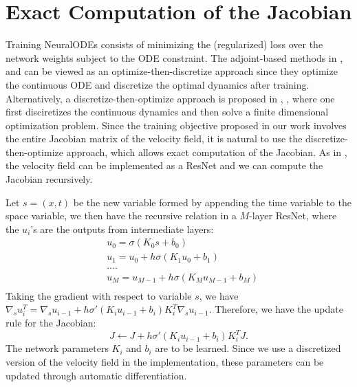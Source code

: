 \newpage

\appendix








\section{Exact Computation of the Jacobian}\label{ExactCompJacobian}
Training NeuralODEs consists of minimizing the (regularized) loss over the network weights subject to the ODE constraint. The adjoint-based methods in \cite{NeuralODE}, \cite{ffjord} and \cite{HowToTrain} can be viewed as an optimize-then-discretize approach since they optimize the continuous ODE and discretize the optimal dynamics after training. Alternatively, a discretize-then-optimize approach is proposed in \cite{OTFlow}, \cite{DiscretizeOptimize}, where one first disciretizes the continuous dynamics and then solve a finite dimensional optimization problem. Since the training objective proposed in our work involves the entire Jacobian matrix of the velocity field, it is natural to use the discretize-then-optimize approach, which allows exact computation of the Jacobian. As in \cite{OTFlow}, the velocity field can be implemented as a ResNet and we can compute the Jacobian recursively. 

Let $s = (x,t)$ be the new variable formed by appending the time variable to the space variable, we then have the recursive relation in a $M$-layer ResNet, where the $u_i$'s are the outputs from intermediate layers:
\begin{align*}
&u_0 = \sigma(K_0s + b_0)\\
&u_1 = u_0 + h\sigma(K_1u_0 + b_1)\\
& ....\\
& u_M = u_{M-1} + h\sigma(K_Mu_{M-1} + b_M)\\
\end{align*}
Taking the gradient with respect to variable $s$, we have $\nabla_s u_i^T = \nabla_s u_{i-1} + h\sigma'(K_iu_{i-1} + b_i)K^T_i\nabla_s u_{i-1}$. 
Therefore, we have the update rule for the Jacobian: $$J \leftarrow J+h\sigma'(K_iu_{i-1} + b_i)K_i^TJ.$$	
The network parameters $K_i$ and $b_i$ are to be learned. Since we use a discretized version of the velocity field in the implementation, these parameters can be updated through automatic differentiation. 







